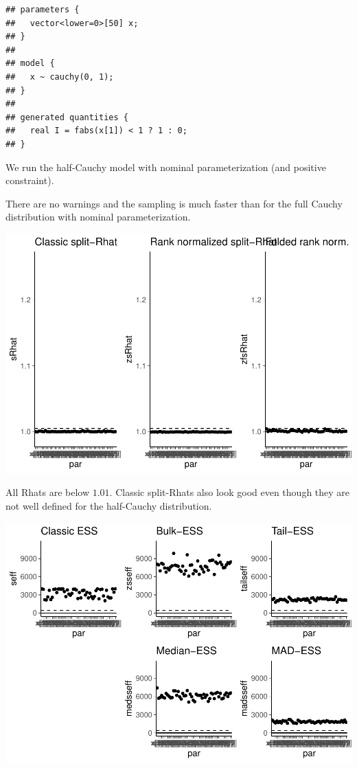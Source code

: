 \documentclass[american,]{article}
\begin{document}
\begin{verbatim}
## parameters {
##   vector<lower=0>[50] x;
## }
## 
## model {
##   x ~ cauchy(0, 1);
## }
## 
## generated quantities {
##   real I = fabs(x[1]) < 1 ? 1 : 0;
## }
\end{verbatim}

We run the half-Cauchy model with nominal parameterization (and positive
constraint).

There are no warnings and the sampling is much faster than for the full
Cauchy distribution with nominal parameterization.

\includegraphics{graphics/rhat-fit-half-nom-1.pdf}

All Rhats are below \(1.01\). Classic split-Rhats also look good even
though they are not well defined for the half-Cauchy distribution.

\includegraphics{graphics/ess-fit-half-nom-1.pdf}
\end{document}
